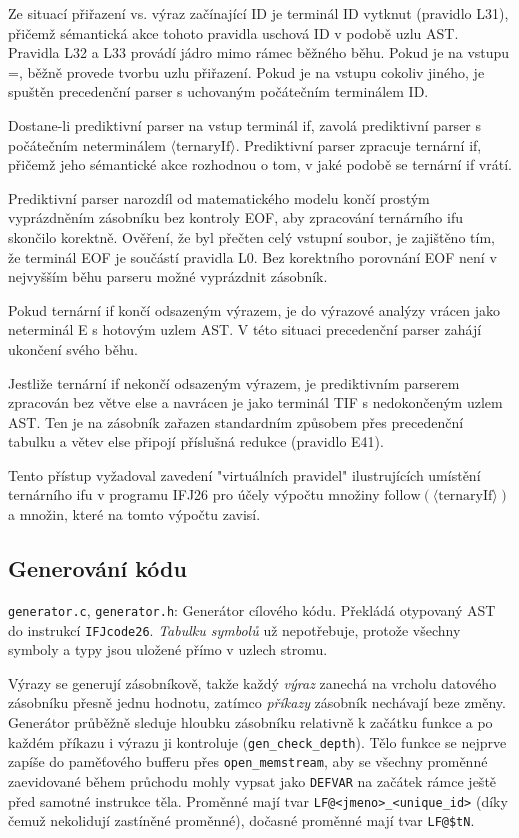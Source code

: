 \documentclass[11pt, a4paper]{article}
\begin{document}
Ze situací přiřazení vs. výraz začínající ID je terminál ID vytknut (pravidlo L31), přičemž sémantická akce tohoto pravidla uschová ID v podobě uzlu AST. Pravidla L32 a L33 provádí jádro mimo rámec běžného běhu. Pokud je na vstupu =, běžně provede tvorbu uzlu přiřazení. Pokud je na vstupu cokoliv jiného, je spuštěn precedenční parser s uchovaným počátečním terminálem ID.

Dostane-li prediktivní parser na vstup terminál if, zavolá prediktivní parser s počátečním neterminálem $\langle\text{ternaryIf}\rangle$. Prediktivní parser zpracuje ternární if, přičemž jeho sémantické akce rozhodnou o tom, v jaké podobě se ternární if vrátí.

Prediktivní parser narozdíl od matematického modelu končí prostým vyprázdněním zásobníku bez kontroly EOF, aby zpracování ternárního ifu skončilo korektně. Ověření, že byl přečten celý vstupní soubor, je zajištěno tím, že terminál EOF je součástí pravidla L0. Bez korektního porovnání EOF není v nejvyšším běhu parseru možné vyprázdnit zásobník.

Pokud ternární if končí odsazeným výrazem, je do výrazové analýzy vrácen jako neterminál E s hotovým uzlem AST. V této situaci precedenční parser zahájí ukončení svého běhu.

Jestliže ternární if nekončí odsazeným výrazem, je prediktivním parserem zpracován bez větve else a navrácen je jako terminál TIF s nedokončeným uzlem AST. Ten je na zásobník zařazen standardním způsobem přes precedenční tabulku a větev else připojí příslušná redukce (pravidlo E41).

Tento přístup vyžadoval zavedení "virtuálních pravidel" ilustrujících umístění ternárního ifu v programu IFJ26 pro účely výpočtu množiny $\text{follow}(\langle\text{ternaryIf}\rangle)$ a množin, které na tomto výpočtu zavisí.

\subsection{Generování kódu}

\texttt{generator.c}, \texttt{generator.h}: Generátor cílového kódu. Překládá otypovaný AST do instrukcí \texttt{IFJcode26}. \emph{Tabulku symbolů} už nepotřebuje, protože všechny symboly a typy jsou uložené přímo v uzlech stromu.

Výrazy se generují zásobníkově, takže každý \emph{výraz} zanechá na vrcholu datového zásobníku přesně jednu hodnotu, zatímco \emph{příkazy} zásobník nechávají beze změny. Generátor průběžně sleduje hloubku zásobníku relativně k začátku funkce a po každém příkazu i výrazu ji kontroluje (\texttt{gen\_check\_depth}). Tělo funkce se nejprve zapíše do paměťového bufferu přes \texttt{open\_memstream}, aby se všechny proměnné zaevidované během průchodu mohly vypsat jako \texttt{DEFVAR} na začátek rámce ještě před samotné instrukce těla. Proměnné mají tvar \texttt{LF@<jmeno>\_<unique\_id>} (díky čemuž nekolidují zastíněné proměnné), dočasné proměnné mají tvar \texttt{LF@\$tN}.
\end{document}
